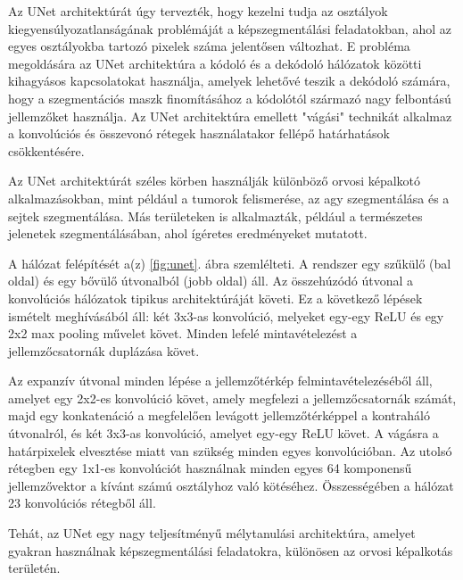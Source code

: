 \documentclass[12pt,a4]{article}
\begin{document}
                Az UNet architektúrát úgy tervezték, hogy kezelni tudja az osztályok kiegyensúlyozatlanságának problémáját a képszegmentálási feladatokban, ahol az egyes osztályokba tartozó pixelek száma jelentősen változhat. E probléma megoldására az UNet architektúra a kódoló és a dekódoló hálózatok közötti kihagyásos kapcsolatokat használja, amelyek lehetővé teszik a dekódoló számára, hogy a szegmentációs maszk finomításához a kódolótól származó nagy felbontású jellemzőket használja. Az UNet architektúra emellett "vágási" technikát alkalmaz a konvolúciós és összevonó rétegek használatakor fellépő határhatások csökkentésére.
    
                Az UNet architektúrát széles körben használják különböző orvosi képalkotó alkalmazásokban, mint például a tumorok felismerése, az agy szegmentálása és a sejtek szegmentálása. Más területeken is  alkalmazták, például a természetes jelenetek szegmentálásában, ahol ígéretes eredményeket mutatott.
    
                A hálózat felépítését a(z) \ref{fig:unet}. ábra szemlélteti. A rendszer egy szűkülő (bal oldal) és egy bővülő útvonalból (jobb oldal) áll. Az összehúzódó útvonal a konvolúciós hálózatok tipikus architektúráját követi. Ez a következő lépések ismételt meghívásából áll: 
                két 3x3-as konvolúció, melyeket egy-egy ReLU és egy 2x2 max pooling művelet követ. Minden lefelé mintavételezést a jellemzőcsatornák duplázása követ. 
    
                Az expanzív útvonal minden lépése a jellemzőtérkép felmintavételezéséből áll, amelyet egy 2x2-es konvolúció követ, amely megfelezi a jellemzőcsatornák számát, majd egy konkatenáció a megfelelően levágott jellemzőtérképpel a kontraháló útvonalról, és két 3x3-as konvolúció, amelyet egy-egy ReLU követ. A vágásra a határpixelek elvesztése miatt van szükség minden egyes konvolúcióban. Az utolsó rétegben egy 1x1-es konvolúciót használnak minden egyes 64 komponensű jellemzővektor a kívánt számú osztályhoz való kötéséhez. Összességében a hálózat 23 konvolúciós rétegből áll.
    
                Tehát, az UNet egy nagy teljesítményű mélytanulási architektúra, amelyet gyakran használnak képszegmentálási feladatokra, különösen az orvosi képalkotás területén. 
        
\end{document}

